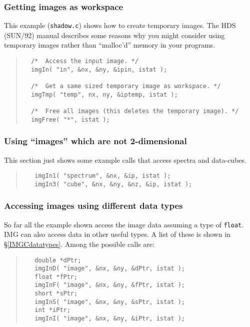 \documentclass[twoside,11pt]{article}
\newcommand{\htmladdnormallink}[2]{#1}
\newcommand{\hyperref}[4]{#2\ref{#4}#3}
\newcommand{\xref}[3]{#1}
\renewcommand{\_}{\texttt{\symbol{95}}}
\newcommand{\myverb}[1]{{\texttt{#1}}}
\newenvironment{code}{\begin{small} \begin{quote}}
                     {\end{quote} \end{small}}
\begin{document}
\subsubsection{Getting images as workspace}
This example
(\htmladdnormallink{\myverb{shadow.c}}{../../bin/examples/img/shadow.c})
shows how to create temporary images.
The \xref{HDS}{sun92}{} (SUN/92) manual describes
\xref{some reasons}{sun92}{HDS_MAP_tuning_parameter}
why you might consider using temporary images rather than
``malloc'd'' memory in your programs.
\begin{code}
\begin{verbatim}
  /*  Access the input image. */
  imgIn( "in", &nx, &ny, &ipin, istat );

  /*  Get a same sized temporary image as workspace. */
  imgTmp( "temp", nx, ny, &iptemp, istat );

  /*  Free all images (this deletes the temporary image). */
  imgFree( "*", istat );
\end{verbatim}
\end{code}

\subsubsection{Using ``images'' which are not 2-dimensional}
This section just shows some example calls that access spectra and
data-cubes.
\begin{code}
\begin{verbatim}
   imgIn1( "spectrum", &nx, &ip, istat );
   imgIn3( "cube", &nx, &ny, &nz, &ip, istat );
\end{verbatim}
\end{code}

\subsubsection{Accessing images using different data types}
So far all the example shown access the image data assuming a type of
\myverb{float}. IMG can also access data in other useful types. A list
of these is shown \hyperref{elsewhere}{in \S}{}{IMGCdatatypes}. Among
the possible calls are:
\begin{code}
\begin{verbatim}
   double *dPtr;
   imgInD( "image", &nx, &ny, &dPtr, istat );
   float *fPtr;
   imgInF( "image", &nx, &ny, &fPtr, istat );
   short *sPtr;
   imgInS( "image", &nx, &ny, &sPtr, istat );
   int *iPtr;
   imgInI( "image", &nx, &ny, &iPtr, istat );
\end{verbatim}
\end{code}
\end{document}
